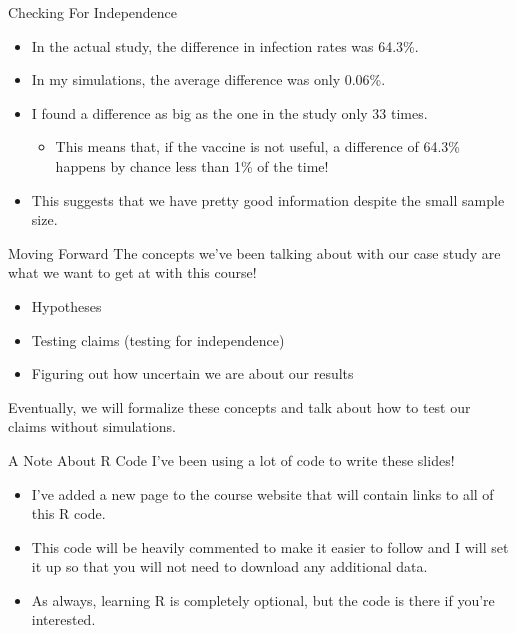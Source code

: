 \begin{frame}{Checking For Independence}
    \begin{itemize}
        \item In the actual study, the difference in infection rates was 64.3\%.
        \item In my simulations, the average difference was only 0.06\%.
        \item I found a difference as big as the one in the study only 33 times.
        \begin{itemize}
            \item This means that, if the vaccine is not useful, a difference of 64.3\% happens by chance less than 1\% of the time!
        \end{itemize}
        \item This suggests that we have pretty good information despite the small sample size.
    \end{itemize}
\end{frame}

\begin{frame}{Moving Forward}
    The concepts we've been talking about with our case study are what we want to get at with this course!
    \begin{itemize}
        \item Hypotheses
        \item Testing claims (testing for independence)
        \item Figuring out how uncertain we are about our results
    \end{itemize}
    Eventually, we will formalize these concepts and talk about how to test our claims without simulations.
\end{frame}

\begin{frame}{A Note About R Code}
    I've been using a lot of code to write these slides!
    \begin{itemize}
        \item I've added a new page to the course website that will contain links to all of this R code.
        \item This code will be heavily commented to make it easier to follow and I will set it up so that you will not need to download any additional data.
        \item As always, learning R is completely optional, but the code is there if you're interested.
    \end{itemize}
\end{frame}